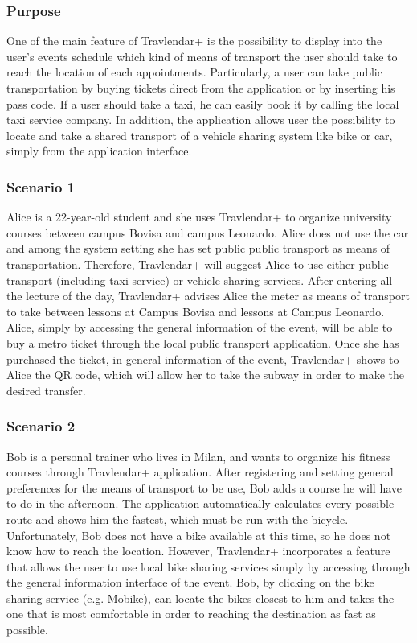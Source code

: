 \subsubsection{Purpose}
One of the main feature of Travlendar+ is the possibility to display into the user's events schedule which kind of means of transport the user should take to reach the location of each appointments. Particularly, a user can take public transportation by buying tickets direct from the application or by inserting his pass code. If a user should take a taxi, he can easily book it by calling the local taxi service company. 
In addition, the application allows user the possibility to locate and take a shared transport of a vehicle sharing system like bike or car, simply from the application interface.

\subsubsection{Scenario 1}
Alice is a 22-year-old student and she uses Travlendar+ to organize university courses between campus Bovisa and campus Leonardo.
Alice does not use the car and among the system setting she has set public public transport as means of transportation. Therefore, Travlendar+ will suggest Alice to use either public transport (including taxi service) or vehicle sharing services.
After entering all the lecture of the day, Travlendar+ advises Alice the meter as means of transport to take between lessons at Campus Bovisa and lessons at Campus Leonardo.
Alice, simply by accessing the general information of the event, will be able to buy a metro ticket through the local public transport application.
Once she has purchased the ticket, in general information of the event, Travlendar+ shows to Alice the QR code, which will allow her to take the subway in order to make the desired transfer.

\subsubsection{Scenario 2}
Bob is a personal trainer who lives in Milan, and wants to organize his fitness courses through Travlendar+ application.
After registering and setting general preferences for the means of transport to be use, Bob adds a course he will have to do in the afternoon. The application automatically calculates every possible route and shows him the fastest, which must be run with the bicycle. Unfortunately, Bob does not have a bike available at this time, so he does not know how to reach the location.
However, Travlendar+ incorporates a feature that allows the user to use local bike sharing services simply by accessing through the general information interface of the event.
Bob, by clicking on the bike sharing service (e.g. Mobike), can locate the bikes closest to him and takes the one that is most comfortable in order to reaching the destination as fast as possible.

